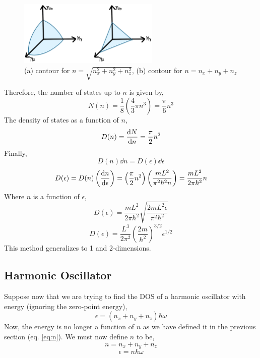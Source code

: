 \documentclass[12pt]{article}
\numberwithin{equation}{section}
\begin{document}
\begin{figure}[h!]
  \begin{center}
    \includegraphics[width=0.6\textwidth]{contour}
  \end{center}
  \caption{(a) contour for $n=\sqrt{n_x^2 + n_y^2 + n_z^2}$, (b) contour for $n=n_x+n_y+n_z$}
  \label{fig:contour}
\end{figure}

Therefore, the number of states up to $n$ is given by,
\begin{equation}
    N(n) = \frac{1}{8}\left(\frac{4}{3}\pi n^3\right) = \frac{\pi}{6}n^3
    \label{eq:N}
\end{equation}
The density of states as a function of $n$,
\begin{equation}
    D(n) = \dv{N}{n} = \frac{\pi}{2}n^2
\end{equation}
Finally,
\begin{equation}
    D(n)\dd{n} = D(\epsilon)\dd{\epsilon}
\end{equation}
\begin{equation}
    D(\epsilon) = D(n) \left(\dv{n}{\epsilon}\right) = \left(\frac{\pi}{2}n^2\right)\left(\frac{mL^2}{\pi^2\hbar^2 n}\right) = \frac{mL^2}{2\pi\hbar^2}n
\end{equation}
Where $n$ is a function of $\epsilon$,
\begin{equation}
    D(\epsilon) = \frac{mL^2}{2\pi\hbar^2} \sqrt{\frac{2mL^2\epsilon}{\pi^2\hbar^2}}
\end{equation}
\begin{equation}
    \boxed{D(\epsilon) = \frac{L^3}{2\pi^2}\left(\frac{2m}{\hbar^2}\right)^{3/2}\epsilon^{1/2}}
\end{equation}
This method generalizes to 1 and 2-dimensions.

\subsection{Harmonic Oscillator}
Suppose now that we are trying to find the DOS of a harmonic oscillator with energy (ignoring the zero-point energy),
\begin{equation}
    \epsilon = (n_x+n_y+n_z)\hbar\omega
\end{equation}
Now, the energy is no longer a function of $n$ as we have defined it in the previous section (eq. \ref{eq:n}). We must now define $n$ to be,
\begin{equation}
    n = n_x + n_y + n_z
\end{equation}
\begin{equation}
    \epsilon = n\hbar\omega
\end{equation}
\end{document}
